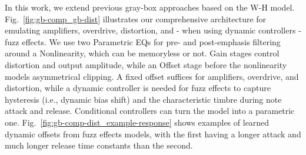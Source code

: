 In this work, we extend previous gray-box approaches based on the W-H model. 
Fig.~\ref{fig:gb-comp_gb-dist} illustrates our comprehensive architecture for emulating amplifiers, overdrive, distortion, and - when using dynamic controllers - fuzz effects.
We use two Parametric EQs \citep{comunità2025nablafxframeworkdifferentiableblackbox} for pre- and post-emphasis filtering around a Nonlinearity, which can be memoryless or not. 
Gain stages control distortion and output amplitude, while an Offset stage before the nonlinearity models asymmetrical clipping. 
A fixed offset suffices for amplifiers, overdrive, and distortion, while a dynamic controller is needed for fuzz effects to capture hysteresis (i.e., dynamic bias shift) and the characteristic timbre during note attack and release.
Conditional controllers can turn the model into a parametric one.
Fig.~\ref{fig:gb-comp-dist_example-response} shows examples of learned dynamic offsets from fuzz effects models, with the first having a longer attack and much longer release time constants than the second.

